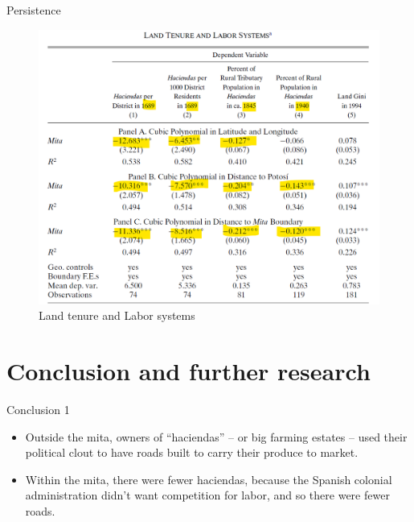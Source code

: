 \documentclass[notes,11pt, aspectratio=169]{beamer}
\begin{document}
\begin{frame}{Persistence}
    \begin{figure}
        \centering
        \includegraphics[width=0.6\linewidth]{Table6.png}
        \caption{Land tenure and Labor systems}
        \label{fig:enter-label}
    \end{figure}
\end{frame}



\section{Conclusion and further research}

\begin{frame}{Conclusion 1}
  \begin{itemize}
    \item Outside the mita, owners of ``haciendas'' -- or big farming estates -- used their political clout to have roads built to carry their produce to market.
    \vspace{3mm}
    \item Within the mita, there were fewer haciendas, because the Spanish colonial administration didn’t want competition for labor, and so there were fewer roads.
    \end{itemize}
\end{frame}
\end{document}
